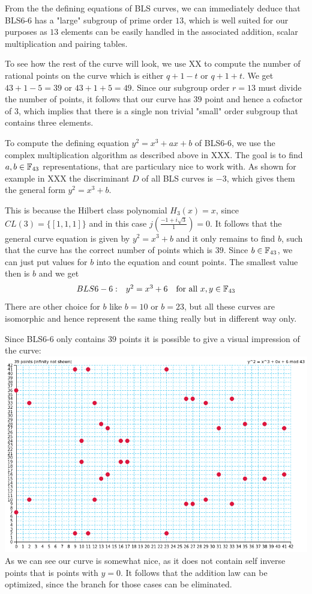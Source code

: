 From the the defining equations of BLS curves, we can immediately deduce that BLS6-6 has a "large" subgroup of prime order $13$, which is well suited for our purposes as $13$ elements can be easily handled in the associated addition, scalar multiplication and pairing tables. 

To see how the rest of the curve will look, we use XX to compute the number of rational points on the curve which is either $q+1-t$ or $q+1+t$. We get $43+1-5= 39$ or $43+1+5=49$. Since our subgroup order $r=13$ must divide the number of points, it follows that our curve has $39$ point and hence a cofactor of $3$, which implies that there is a single non trivial "small" order subgroup that contains three elements.

To compute the defining equation $y^2=x^3 + ax +b$ of BLS6-6, we use the complex multiplication algorithm as described above in XXX. The goal is to find $a,b\in\mathbb{F}_{43}$ representations, that are particulary nice to work with. As shown for example in XXX the discriminant $D$ of all BLS curves is $-3$, which gives them the general form $y^2 = x^3 +b$.

This is because the Hilbert class polynomial $H_3(x)=x$, since $CL(3) = \{[1,1,1]\}$ and in this case $j(\frac{-1 + i \sqrt{3}}{1})=0$. It follows that the general curve equation is given by $y^2 = x^3 +b$ and it only remains to find $b$, such that the curve has the correct number of points which is $39$. Since $b\in \mathbb{F}_{43}$, we can just put values for $b$ into the equation and count points. The smallest value then is $b$ and we get
$$
\begin{array}{lcrr}
BLS6-6: & y^2 = x^3 + 6& \text{for all } x,y \in \mathbb{F}_{43}
\end{array}
$$
There are other choice for $b$ like $b=10$ or $b=23$, but all these curves are isomorphic and hence represent the same thing really but in different way only.

Since BLS6-6 only contains $39$ points it is possible to give a visual impression of the curve:
\includegraphics[scale=0.6]{figures/bls6-6.png}
As we can see our curve is somewhat nice, as it does not contain self inverse points that is points with $y=0$. It follows that the addition law can be optimized, since the branch for those cases can be eliminated. 

